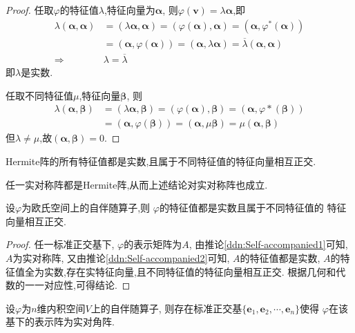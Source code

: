 \begin{proof}
  任取$\varphi$的特征值$\lambda$,特征向量为$\bm{\alpha}$,
  则$\varphi(\bm{v})=\lambda\bm{\alpha}$,即
  \begin{align*}
  \lambda(\bm{\alpha},\bm{\alpha}) & = (\lambda\bm{\alpha},\bm{\alpha}) = 
  (\varphi(\bm{\alpha}),\bm{\alpha}) = (\bm{\alpha},\varphi^*(\bm{\alpha}))\\
  & = (\bm{\alpha},\varphi(\bm{\alpha})) = (\bm{\alpha},\lambda\bm{\alpha}) =
  \overline{\lambda}(\bm{\alpha},\bm{\alpha})\\
  \Longrightarrow & \lambda = \overline{\lambda}
  \end{align*}
  即$\lambda$是实数.

  任取不同特征值$\mu$,特征向量$\bm{\beta}$,
  则
  \begin{align*}
    \lambda(\bm{\alpha},\bm{\beta}) & = (\lambda\bm{\alpha},\bm{\beta}) =
    (\varphi(\bm{\alpha}),\bm{\beta}) = (\bm{\alpha},\varphi*(\bm{\beta}))\\
    & = (\bm{\alpha},\varphi(\bm{\beta})) = (\bm{\alpha},\mu\bm{\beta}) =
    \mu(\bm{\alpha},\bm{\beta})
  \end{align*}
  但$\lambda \neq \mu$,故$(\bm{\alpha},\bm{\beta})=0$.
\end{proof}

\begin{deduction}\label{ddn:Self-accompanied2}
  Hermite阵的所有特征值都是实数,且属于不同特征值的特征向量相互正交.

  任一实对称阵都是Hermite阵,从而上述结论对实对称阵也成立.
\end{deduction}

\begin{deduction}\label{ddn:Self-accompanied3}
  设$\varphi$为欧氏空间上的自伴随算子,则
  $\varphi$的特征值都是实数且属于不同特征值的
  特征向量相互正交.
\end{deduction}

\begin{proof}
  任一标准正交基下, $\varphi$的表示矩阵为$A$,
  由推论\ref{ddn:Self-accompanied1}可知, $A$为实对称阵,
  又由推论\ref{ddn:Self-accompanied2}可知, $A$的特征值都是实数,
  $A$的特征值全为实数,存在实特征向量,且不同特征值的特征向量相互正交.
  根据几何和代数的一一对应性,可得结论.
\end{proof}

\begin{theorem}\label{thm:Self-accompanied1}
  设$\varphi$为$n$维内积空间$V$上的自伴随算子,
  则存在标准正交基$\{\bm{e}_1,\bm{e}_2,\cdots,\bm{e}_n\}$使得 
  $\varphi$在该基下的表示阵为实对角阵.  
\end{theorem}

